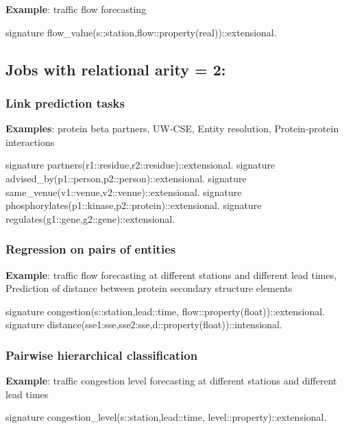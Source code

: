 \textbf{Example}: traffic flow forecasting

\begin{code}
signature flow_value(s::station,flow::property(real))::extensional.
\end{code}

\subsection{Jobs with relational arity = 2:}

\subsubsection{Link prediction tasks}

\textbf{Examples}: protein beta partners, UW-CSE, Entity resolution,
Protein-protein interactions

\begin{code}
signature partners(r1::residue,r2::residue)::extensional.
signature advised_by(p1::person,p2::person)::extensional.
signature same_venue(v1::venue,v2::venue)::extensional.
signature phosphorylates(p1::kinase,p2::protein)::extensional.
signature regulates(g1::gene,g2::gene)::extensional.
\end{code}

\subsubsection{Regression on pairs of entities}

\textbf{Example}: traffic flow forecasting at different stations and
different lead times, Prediction of distance between protein
secondary structure elements

\begin{code}
signature congestion(s::station,lead::time,
                     flow::property(float))::extensional.
signature distance(sse1:sse,sse2:sse,d::property(float))::intensional.
\end{code}

\subsubsection{Pairwise hierarchical classification}

\textbf{Example}: traffic congestion level forecasting at different stations and different lead times

\begin{code}
signature congestion_level(s::station,lead::time,
                           level::property)::extensional.
\end{code}

